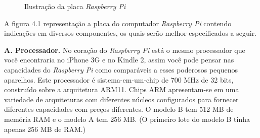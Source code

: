\begin{figure}[ht]
    \centering
    \caption{Ilustração da placa \textit{Raspberry Pi}}
\end{figure}

A figura 4.1 representação a placa do computador \textit{Raspberry Pi} contendo indicações em diversos componentes, os quais serão melhor especificados a seguir.

\textbf{A. Processador.} No coração do \textit{Raspberry Pi} está o mesmo processador que você encontraria no iPhone 3G e no Kindle 2, assim você pode pensar nas capacidades do \textit{Raspberry Pi} como comparáveis a esses poderosos pequenos aparelhos. Este processador é sistema-em-um-chip de 700 MHz de 32 bits, construído sobre a arquitetura ARM11. Chips ARM apresentam-se em uma variedade de arquiteturas com diferentes núcleos configurados para fornecer diferentes capacidades com preços diferentes. O modelo B tem 512 MB de memória RAM e o modelo A tem 256 MB. (O primeiro lote do modelo B tinha apenas 256 MB de RAM.)
    
